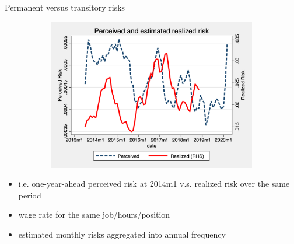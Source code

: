 \documentclass{beamer}
\begin{document}
\begin{frame}{Permanent versus transitory risks}
\begin{figure}[ht]
\begin{subfigure}[b]{0.32\textwidth}
		\includegraphics[width=\textwidth]{figures/real_volatility_compare.png}
	\end{subfigure} 
	\end{figure}
	\begin{itemize}
		\item i.e. one-year-ahead perceived risk at 2014m1 v.s. realized risk over the same period
		\item wage rate for the same job/hours/position
		\item estimated monthly risks aggregated into annual frequency 
	\end{itemize}
\hyperlink{appendix:monthly_inequality_vol}{} 
\hyperlink{appendix:monthly_decomposition_compare_psid}{} 
\end{frame}
\end{document}
